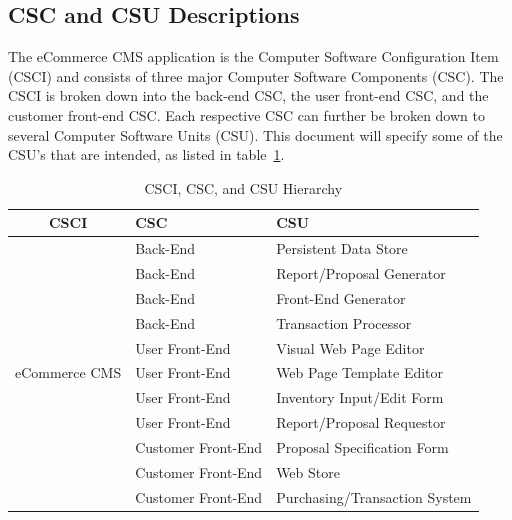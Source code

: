 \documentclass{article}
\begin{document}

\pagebreak
\subsection{CSC and CSU Descriptions}

The eCommerce CMS application is the Computer Software Configuration Item
(CSCI) and consists of three major Computer Software Components (CSC).  The
CSCI is broken down into the back-end CSC, the user front-end CSC, and the
customer front-end CSC.  Each respective CSC can further be broken down to
several Computer Software Units (CSU).  This document will specify some of the
CSU's that are intended, as listed in table~\ref{software-hierarchy}.

\begin{table}[H]
    \begin{tabular}{|c|l|p{7.5cm}|}\hline
        CSCI & CSC & CSU \\\hline\hline
        \multirow{12}{*}{eCommerce CMS}
         & Back-End & Persistent Data Store \\\cline{2-3}
         & Back-End & Report/Proposal Generator \\\cline{2-3}
         & Back-End & Front-End Generator \\\cline{2-3}
         & Back-End & Transaction Processor \\\cline{2-3}
         & User Front-End & Visual Web Page Editor \\\cline{2-3}
         & User Front-End & Web Page Template Editor \\\cline{2-3}
         & User Front-End & Inventory Input/Edit Form \\\cline{2-3}
         & User Front-End & Report/Proposal Requestor \\\cline{2-3}
         & Customer Front-End & Proposal Specification Form \\\cline{2-3}
         & Customer Front-End & Web Store \\\cline{2-3}
         & Customer Front-End & Purchasing/Transaction System \\\hline
    \end{tabular}
    \caption{CSCI, CSC, and CSU Hierarchy}
    \label{software-hierarchy}
\end{table}
\end{document}
